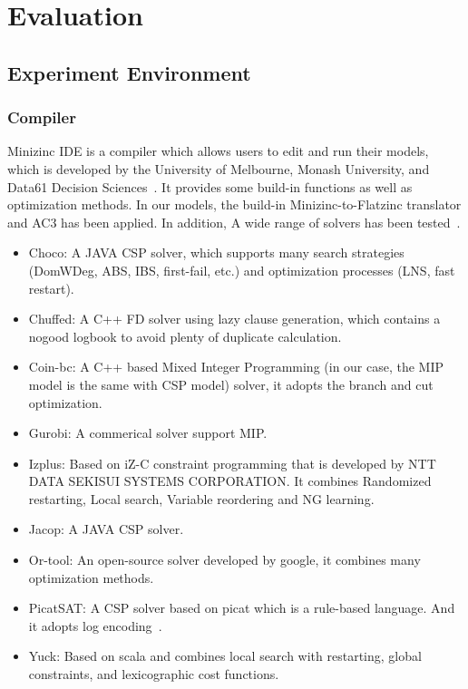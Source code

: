 \chapter{Evaluation}
\label{cha:evaluation}
\section{Experiment Environment}
\subsection{Compiler}
\label{section:compiler}
Minizinc IDE is a compiler which allows users to edit and run their models, which is developed by the University of Melbourne, Monash University, and Data61 Decision Sciences~\cite{r6}. It provides some build-in functions as well as optimization methods. In our models, the build-in Minizinc-to-Flatzinc translator and AC3 has been applied. In addition, A wide range of solvers has been tested~\cite{r6}.
\begin{itemize}
    \item Choco: A JAVA CSP solver, which supports many search strategies (DomWDeg, ABS, IBS, first-fail, etc.) and optimization processes (LNS, fast restart).
    \item Chuffed: A C++ FD solver using lazy clause generation, which contains a nogood logbook to avoid plenty of duplicate calculation.
    \item Coin-bc: A C++ based Mixed Integer Programming (in our case, the MIP model is the same with CSP model) solver, it adopts the branch and cut optimization.
    \item Gurobi: A commerical solver support MIP.
    \item Izplus: Based on iZ-C constraint programming that is developed by NTT DATA SEKISUI SYSTEMS CORPORATION. It combines Randomized restarting, Local search, Variable reordering and NG learning.
    \item Jacop: A JAVA CSP solver.
    \item Or-tool: An open-source solver developed by google, it combines many optimization methods.
    \item PicatSAT: A CSP solver based on picat which is a rule-based language. And it adopts log encoding~\cite{r8}.
    \item Yuck: Based on scala and combines local search with restarting, global constraints, and lexicographic cost functions.
\end{itemize}
